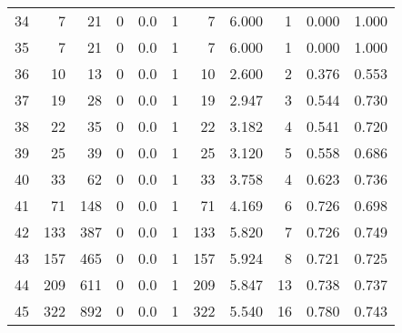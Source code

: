 \begin{tabular}{lrrrrrrrrrr}
34 &        7 &       21 &                 0 &               0.0 &                       1 &                          7 &       6.000 &              1 &       0.000 &             1.000 \\
35 &        7 &       21 &                 0 &               0.0 &                       1 &                          7 &       6.000 &              1 &       0.000 &             1.000 \\
36 &       10 &       13 &                 0 &               0.0 &                       1 &                         10 &       2.600 &              2 &       0.376 &             0.553 \\
37 &       19 &       28 &                 0 &               0.0 &                       1 &                         19 &       2.947 &              3 &       0.544 &             0.730 \\
38 &       22 &       35 &                 0 &               0.0 &                       1 &                         22 &       3.182 &              4 &       0.541 &             0.720 \\
39 &       25 &       39 &                 0 &               0.0 &                       1 &                         25 &       3.120 &              5 &       0.558 &             0.686 \\
40 &       33 &       62 &                 0 &               0.0 &                       1 &                         33 &       3.758 &              4 &       0.623 &             0.736 \\
41 &       71 &      148 &                 0 &               0.0 &                       1 &                         71 &       4.169 &              6 &       0.726 &             0.698 \\
42 &      133 &      387 &                 0 &               0.0 &                       1 &                        133 &       5.820 &              7 &       0.726 &             0.749 \\
43 &      157 &      465 &                 0 &               0.0 &                       1 &                        157 &       5.924 &              8 &       0.721 &             0.725 \\
44 &      209 &      611 &                 0 &               0.0 &                       1 &                        209 &       5.847 &             13 &       0.738 &             0.737 \\
45 &      322 &      892 &                 0 &               0.0 &                       1 &                        322 &       5.540 &             16 &       0.780 &             0.743 \\

\end{tabular}
